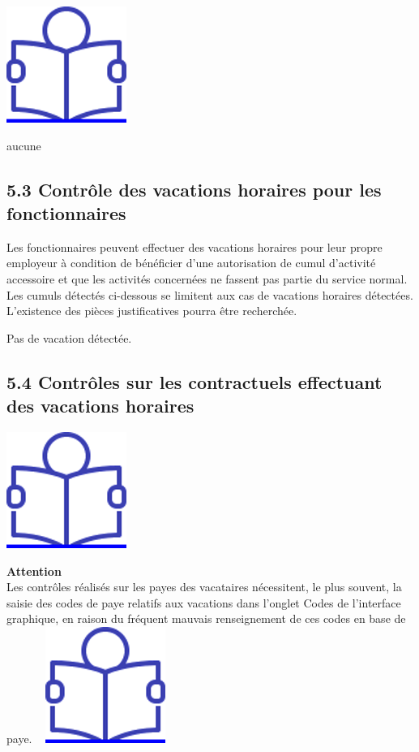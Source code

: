 \href{../Docs/Notices/fiche_PFI.odt}{\includegraphics{icones/Notice.png}}

aucune

\hypertarget{controle-des-vacations-horaires-pour-les-fonctionnaires}{%
\subsection{5.3 Contrôle des vacations horaires pour les
fonctionnaires}\label{controle-des-vacations-horaires-pour-les-fonctionnaires}}

Les fonctionnaires peuvent effectuer des vacations horaires pour leur
propre employeur à condition de bénéficier d'une autorisation de cumul
d'activité accessoire et que les activités concernées ne fassent pas
partie du service normal. Les cumuls détectés ci-dessous se limitent aux
cas de vacations horaires détectées. L'existence des pièces
justificatives pourra être recherchée.

Pas de vacation détectée.

\hypertarget{controles-sur-les-contractuels-effectuant-des-vacations-horaires}{%
\subsection{5.4 Contrôles sur les contractuels effectuant des vacations
horaires}\label{controles-sur-les-contractuels-effectuant-des-vacations-horaires}}

\href{../Docs/Notices/fiche_CEV_droit.odt}{\includegraphics{icones/Notice.png}}

\textbf{Attention}\\
Les contrôles réalisés sur les payes des vacataires nécessitent, le plus
souvent, la saisie des codes de paye relatifs aux vacations dans
l'onglet Codes de l'interface graphique, en raison du fréquent mauvais
renseignement de ces codes en base de paye. ~
\href{../Docs/Notices/fiche_onglet_codes.odt}{\includegraphics{icones/Notice.png}}

